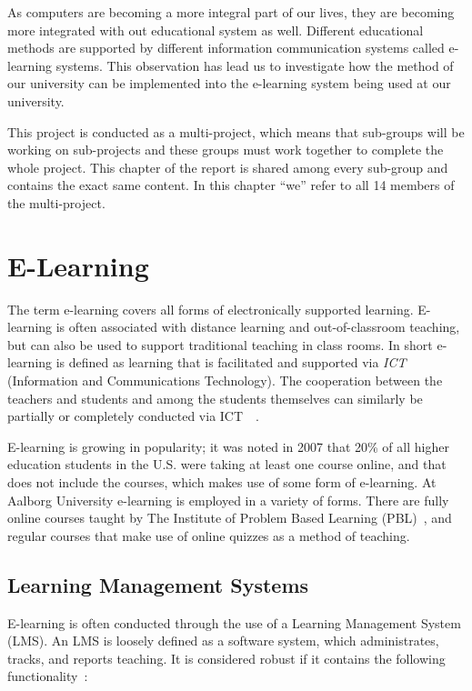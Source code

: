 
As computers are becoming a more integral part of our lives, they are becoming more integrated with out educational system as well.
Different educational methods are supported by different information communication systems called e-learning systems.
This observation has lead us to investigate how the method of our university can be implemented into the e-learning system being used at our university.

This project is conducted as a multi-project, which means that sub-groups will be working on sub-projects and these groups must work together to complete the whole project.
This chapter of the report is shared among every sub-group and contains the exact same content.
In this chapter ``we'' refer to all 14 members of the multi-project.

\section{E-Learning}
\label{sec:e-learning}
The term e-learning covers all forms of electronically supported learning. 
E-learning is often associated with distance learning and out-of-classroom teaching, but can also be used to support traditional teaching in class rooms. 
In short e-learning is defined as learning that is facilitated and supported via \emph{ICT} (Information and Communications Technology). 
The cooperation between the teachers and students and among the students themselves can similarly be partially or completely conducted via ICT~\cite{def-e-learning1}~\cite{def-e-learning2}.

E-learning is growing in popularity; it was noted in 2007 that 20\% of all higher education students in the U.S. were taking at least one course online, and that does not include the courses, which makes use of some form of e-learning.	
At Aalborg University e-learning is employed in a variety of forms. 
There are fully online courses taught by The Institute of Problem Based Learning (PBL)~\cite{mpbl}, and regular courses that make use of online quizzes as a method of teaching.

\subsection{Learning Management Systems}
\label{sub:lms}
E-learning is often conducted through the use of a Learning Management System (LMS). 
An LMS is loosely defined as a software system, which administrates, tracks, and reports teaching. 
It is considered robust if it contains the following functionality~\citep{Ellis09}:

